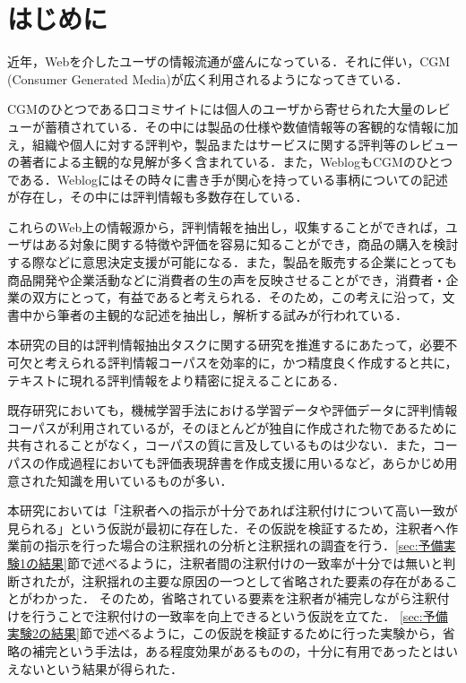 \documentclass[japanese]{jnlp_1.4}
\begin{document}
\maketitle


\section{はじめに}\label{Chapter:introduction}

近年，Webを介したユーザの情報流通が盛んになっている．それに伴い，CGM (Consumer Generated Media)が広く利用されるようになってきている．

CGMのひとつである口コミサイトには個人のユーザから寄せられた大量のレビューが蓄積されている．その中には製品の仕様や数値情報等の客観的な情報に加え，組織や個人に対する評判や，製品またはサービスに関する評判等のレビューの著者による主観的な見解が多く含まれている．また，WeblogもCGMのひとつである．Weblogにはその時々に書き手が関心を持っている事柄についての記述が存在し，その中には評判情報も多数存在している．

これらのWeb上の情報源から，評判情報を抽出し，収集することができれば，ユーザはある対象に関する特徴や評価を容易に知ることができ，商品の購入を検討する際などに意思決定支援が可能になる．また，製品を販売する企業にとっても商品開発や企業活動などに消費者の生の声を反映させることができ，消費者・企業の双方にとって，有益であると考えられる．そのため，この考えに沿って，文書中から筆者の主観的な記述を抽出し，解析する試みが行われている．

本研究の目的は評判情報抽出タスクに関する研究を推進するにあたって，必要不可欠と考えられる評判情報コーパスを効率的に，かつ精度良く作成すると共に，テキストに現れる評判情報をより精密に捉えることにある．

既存研究においても，機械学習手法における学習データや評価データに評判情報コーパスが利用されているが，そのほとんどが独自に作成された物であるために共有されることがなく，コーパスの質に言及しているものは少ない．また，コーパスの作成過程においても評価表現辞書を作成支援に用いるなど，あらかじめ用意された知識を用いているものが多い．


本研究においては「注釈者への指示が十分であれば注釈付けについて高い一致が見られる」という仮説が最初に存在した．その仮説を検証するため，注釈者へ作業前の指示を行った場合の注釈揺れの分析と注釈揺れの調査を行う．\ref{sec:予備実験1の結果}節で述べるように，注釈者間の注釈付けの一致率が十分では無いと判断されたが，注釈揺れの主要な原因の一つとして省略された要素の存在があることがわかった．
そのため，省略されている要素を注釈者が補完しながら注釈付けを行うことで注釈付けの一致率を向上できるという仮説を立てた．
\ref{sec:予備実験2の結果}節で述べるように，この仮説を検証するために行った実験から，省略の補完という手法は，ある程度効果があるものの，十分に有用であったとはいえないという結果が得られた．
\end{document}
